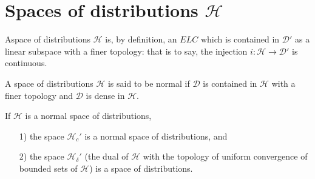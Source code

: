 \chapter{Spaces of distributions \texorpdfstring{$\mathscr{H}$}{H}}\label{chap3}

\setcounter{section}{3}
\setcounter{definition}{0}
\begin{definition}\label{chap3:def3.1}
A\pageoriginale space of distributions $\mathscr{H}$ is, by
definition, an $ELC$ which is contained in $\mathscr{D}'$ as a linear
subspace with a finer topology: that is to say, the injection
$i:\mathscr{H} \to \mathscr{D}'$ is continuous.  
\end{definition}

\begin{definition}\label{chap3:def3.2}
A space of distributions $\mathscr{H}$ is said to be normal if
$\mathscr{D}$ is contained in $\mathscr{H}$ with a finer topology and
$\mathscr{D}$ is dense in $\mathscr{H}$.
\end{definition}

\setcounter{section}{3}
\setcounter{prop}{0}
\begin{prop}\label{chap3:prop3.1}
If $\mathscr{H}$ is a normal space of distributions,
\begin{itemize}
\item[1)] the space $\mathscr{H}_c'$ is a normal space of
  distributions, and
\item[2)] the space $\mathscr{H}_\delta'$ (the dual of $\mathscr{H}$
  with the topology of uniform convergence of bounded sets of
  $\mathscr{H}$) is a space of distributions.
\end{itemize}
\end{prop}

